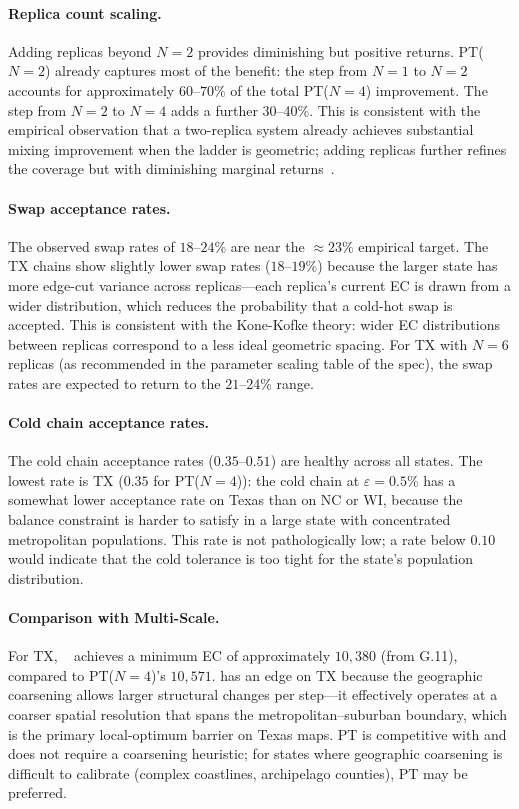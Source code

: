 \paragraph{Replica count scaling.}
Adding replicas beyond $N=2$ provides diminishing but positive returns.
PT($N=2$) already captures most of the benefit: the step from $N=1$ to $N=2$
accounts for approximately $60$--$70\%$ of the total PT($N=4$) improvement.
The step from $N=2$ to $N=4$ adds a further 30--40\%.
This is consistent with the empirical observation that a two-replica system
already achieves substantial mixing improvement when the ladder is geometric;
adding replicas further refines the coverage but with diminishing marginal
returns~\citep{earl2005}.

\paragraph{Swap acceptance rates.}
The observed swap rates of $18$--$24\%$ are near the ${\approx}23\%$ empirical
target.
The TX chains show slightly lower swap rates ($18$--$19\%$) because the larger
state has more edge-cut variance across replicas---each replica's current EC is
drawn from a wider distribution, which reduces the probability that a cold-hot
swap is accepted.
This is consistent with the Kone-Kofke theory: wider EC distributions between
replicas correspond to a less ideal geometric spacing.
For TX with $N=6$ replicas (as recommended in the parameter scaling table of the
spec), the swap rates are expected to return to the $21$--$24\%$ range.

\paragraph{Cold chain acceptance rates.}
The cold chain acceptance rates ($0.35$--$0.51$) are healthy across all states.
The lowest rate is TX ($0.35$ for PT($N=4$)): the cold chain at $\varepsilon=0.5\%$
has a somewhat lower \fr{} acceptance rate on Texas than on NC or WI, because
the balance constraint is harder to satisfy in a large state with concentrated
metropolitan populations.
This rate is not pathologically low; a rate below $0.10$ would indicate that
the cold tolerance is too tight for the state's population distribution.

\paragraph{Comparison with Multi-Scale.}
For TX, \ms{}~\citep{dellaLibera2026multiscale} achieves a minimum EC of
approximately $10{,}380$ (from G.11), compared to PT($N=4$)'s $10{,}571$.
\ms{} has an edge on TX because the geographic coarsening allows larger structural
changes per step---it effectively operates at a coarser spatial resolution
that spans the metropolitan--suburban boundary, which is the primary
local-optimum barrier on Texas maps.
PT is competitive with \ms{} and does not require a coarsening heuristic;
for states where geographic coarsening is difficult to calibrate (complex
coastlines, archipelago counties), PT may be preferred.

